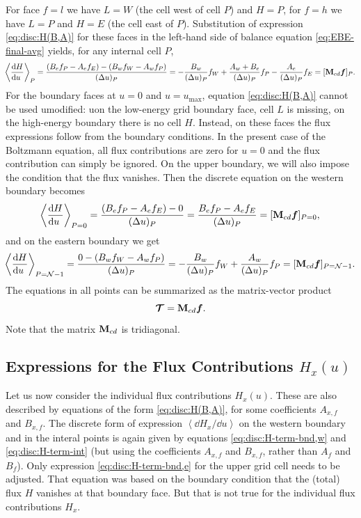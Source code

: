 \documentclass{book}
\newcommand{\MEAN}[1]{\ensuremath{\!\left\langle{{#1}}\right\rangle}}
\newcommand{\bvec}[1]{{\ensuremath{\bm {#1}}}}
\begin{document}
For face $f=l$ we have $L=W$ (the cell west of cell $P$) and $H=P$, for $f=h$
we have $L=P$ and $H=E$ (the cell east of $P$). Substitution of expression
\eqref{eq:disc:H(B,A)} for these faces in the left-hand side of balance
equation \eqref{eq:EBE-final-avg} yields, for any internal cell $P$,
\begin{equation}
	\MEAN{\DERIV{H}{u}}_P
	= \frac{(B_ef_P - A_ef_E) - (B_wf_W - A_wf_P)}{(\Delta u)_P}
	= -\frac{B_w}{(\Delta u)_P}f_W + \frac{A_w+B_e}{(\Delta u)_P}f_P - \frac{A_e}{(\Delta u)_P}f_E
	= [\mat{M}_{cd}\bvec{f}]_P.
	\label{eq:disc:H-term-int}
\end{equation}
For the boundary faces at $u=0$ and $u=u_{\text{max}}$, equation
\eqref{eq:disc:H(B,A)} cannot be used umodified:
uon the low-energy grid boundary face, cell $L$ is missing, on the high-energy
boundary there is no cell $H$. Instead, on these faces the flux expressions
follow from the boundary conditions. In the present case of the Boltzmann
equation, all flux contributions are zero for $u=0$ and the flux contribution
can simply be ignored. On the upper boundary, we will also impose the condition
that the flux vanishes. Then the discrete equation on the western boundary becomes
\begin{equation}
	\MEAN{\DERIV{H}{u}}_{P=0}
	= \frac{(B_ef_P - A_ef_E) - 0}{(\Delta u)_P}
	=  \frac{B_ef_P - A_ef_E}{(\Delta u)_P}
	= [\mat{M}_{cd}\bvec{f}]_{P=0},
	\label{eq:disc:H-term-bnd,w}
\end{equation}
and on the eastern boundary we get
\begin{equation}
	\MEAN{\DERIV{H}{u}}_{P={\cal N}-1}
	= \frac{0 - (B_wf_W - A_wf_P)}{(\Delta u)_P}
	=  -\frac{B_w}{(\Delta u)_P}f_W + \frac{A_w}{(\Delta u)_P}f_P
	= [\mat{M}_{cd}\bvec{f}]_{P={\cal N}-1}.
	\label{eq:disc:H-term-bnd,e}
\end{equation}
The equations in all points can be summarized as the matrix-vector product
\begin{equation}
	\bvec{{\cal T}}
	= \mat{M}_{cd}\bvec{f}.
	\label{eq:disc:H-term}
\end{equation}
Note that the matrix ${{\mathbf{M}}}_{cd}$ is tridiagonal.

\subsection{Expressions for the Flux Contributions $H_x(u)$}

Let us now consider the individual flux contributions $H_x(u)$. These are also
described by equations of the form \eqref{eq:disc:H(B,A)}, for some coefficients
$A_{x,f}$ and $B_{x,f}$. The discrete form of expression $\MEAN{\dd{H_x}/\dd{u}}$
on the western boundary and in the interal points is again given by equations
\eqref{eq:disc:H-term-bnd,w} and \eqref{eq:disc:H-term-int} (but using the
coefficients $A_{x,f}$ and $B_{x,f}$, rather than $A_f$ and $B_f$). Only
expression \eqref{eq:disc:H-term-bnd,e} for the upper grid cell needs to be
adjusted. That equation was based on the boundary condition that the (total)
flux $H$ vanishes at that boundary face. But that is not true for the
individual flux contributions $H_x$.
\end{document}
